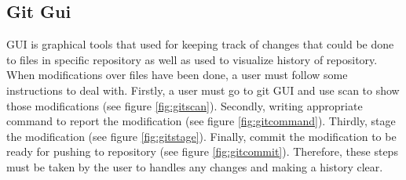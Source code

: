 \documentclass[11pt]{report}
\begin{document}
\subsection{Git Gui}
\label{subsec: gitgui}
GUI is graphical tools that used for keeping track of changes that could be done to files in specific repository as well as used to visualize history of repository. When modifications over files have been done, a user must follow some instructions to deal with. Firstly, a user must go to git GUI and use scan to show those modifications (see figure \ref{fig:gitscan}). Secondly, writing appropriate command to report the modification (see figure \ref{fig:gitcommand}). Thirdly, stage the modification (see figure \ref{fig:gitstage}). Finally, commit the modification to be ready for pushing to repository (see figure \ref{fig:gitcommit}). Therefore, these steps must be taken by the user to handles any changes and making a history clear.
\end{document}
